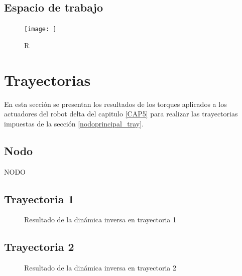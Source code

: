     \newpage
    
    \subsection{Espacio de trabajo}
        \begin{figure}[h]
            \centering
            \texttt{[image: ]}
            \caption{R}
            \label{f:cap7_ws6}
        \end{figure}  

        
        
        
        
\newpage


\section{Trayectorias}
    En esta sección se presentan los resultados de los torques aplicados a los actuadores del robot delta del capitulo \ref{CAP5} para realizar las trayectorias impuestas de la sección \ref{nodoprincipal_tray}.

    \subsection{Nodo}
    NODO 

    \subsection{Trayectoria 1}
    
        \begin{figure}[h]
            \centering
            \caption{Resultado de la dinámica inversa en trayectoria 1}
            \label{f:cap7_tray1}
        \end{figure}
                
    \subsection{Trayectoria 2}
    
        \begin{figure}[h]
            \centering
            \caption{Resultado de la dinámica inversa en trayectoria 2}
            \label{f:cap7_tray2}
        \end{figure}
        
